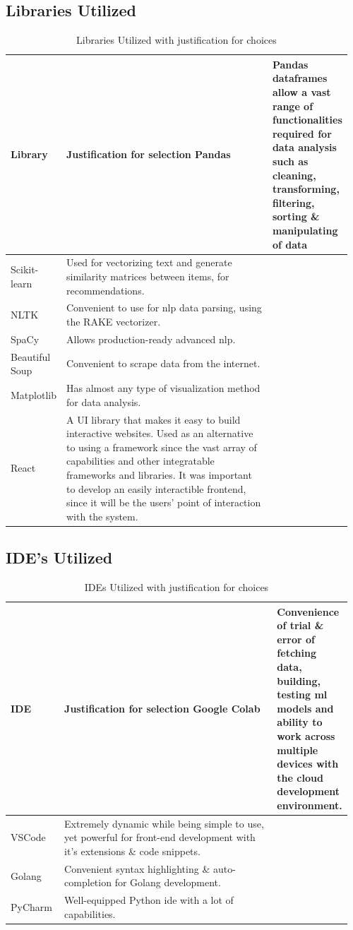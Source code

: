 \subsection{Libraries Utilized}
\vspace{-4mm}
\begin{longtable}{|p{0.16\linewidth}|p{0.8\linewidth}|}
\caption{Libraries Utilized with justification for choices}\\ 
\hline
\textbf{Library} & \textbf{Justification for selection}\endfirsthead 
\hline
Pandas & Pandas dataframes allow a vast range of functionalities required for data analysis such as cleaning, transforming, filtering, sorting \& manipulating of data \\
\hline
Scikit-learn & Used for vectorizing text and generate similarity matrices between items, for recommendations. \\
\hline
NLTK & Convenient to use for \gls{nlp} data parsing, using the RAKE vectorizer. \\
\hline
SpaCy & Allows production-ready advanced \gls{nlp}. \\
\hline
Beautiful Soup & Convenient to scrape data from the internet. \\
\hline
Matplotlib & Has almost any type of visualization method for data analysis. \\
\hline
React & A UI library that makes it easy to build interactive websites. Used as an alternative to using a framework since the vast array of capabilities and other integratable frameworks and libraries. It was important to develop an easily interactible frontend, since it will be the users’ point of interaction with the system. \\
\hline
\end{longtable}

\subsection{IDE’s Utilized}
\vspace{-4mm}
\begin{longtable}{|p{0.16\linewidth}|p{0.8\linewidth}|}
\caption{IDEs Utilized with justification for choices}\\ 
\hline
\textbf{IDE} & \textbf{Justification for selection}\endfirsthead 
\hline
Google Colab & Convenience of trial \& error of fetching data, building, testing \gls{ml} models and ability to work across multiple devices with the cloud development environment. \\
\hline
VSCode & Extremely dynamic while being simple to use, yet powerful for front-end development with it's extensions \& code snippets. \\
\hline
Golang & Convenient syntax highlighting \& auto-completion for Golang development. \\
\hline
PyCharm & Well-equipped Python \gls{ide} with a lot of capabilities.\\
\hline
\end{longtable}


